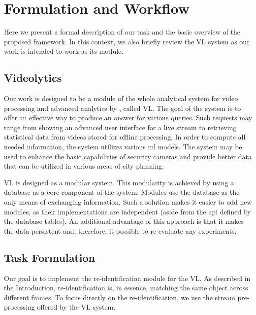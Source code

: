 \chapter{Formulation and Workflow}

\label{ch:workflow}

Here we present a formal description of our task and the basic overview of the proposed framework. In this context, we also briefly review the \gls{VL} system as our work is intended to work as its module.

\section{Videolytics}

\label{sec:vl}

Our work is designed to be a module of the whole analytical system for video processing and advanced analytics by \cite{videolytics}, called \gls{VL}. The goal of the system is to offer an effective way to produce an answer for various queries. Such requests may range from showing an advanced user interface for a live stream to retrieving statistical data from videos stored for offline processing. In order to compute all needed information, the system utilizes various \gls{ml} models. The system may be used to enhance the basic capabilities of security cameras and provide better data that can be utilized in various areas of city planning.

\Gls{VL} is designed as a modular system. This modularity is achieved by using a database as a core component of the system. Modules use the database as the only means of exchanging information. Such a solution makes it easier to add new modules, as their implementations are independent (aside from the \gls{api} defined by the database tables). An additional advantage of this approach is that it makes the data persistent and, therefore, it possible to re-evaluate any experiments.

\section{Task Formulation}

Our goal is to implement the re-identification module for the \gls{VL}. As described in the Introduction, re-identification is, in essence, matching the same object across different frames. To focus directly on the re-identification, we use the stream pre-processing offered by the \gls{VL} system.

